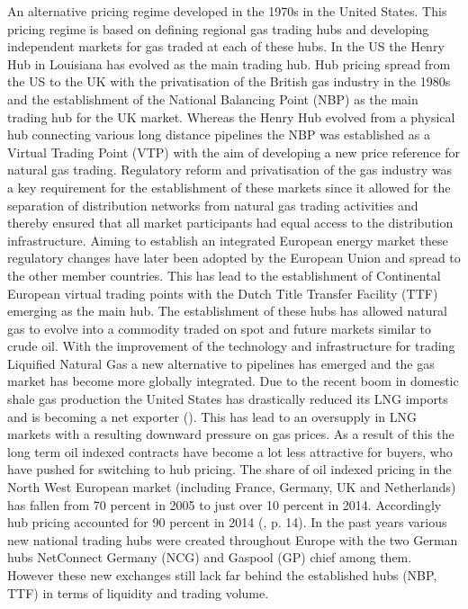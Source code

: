 An alternative pricing regime developed in the 1970s in the United States. This pricing regime is based on defining regional gas trading hubs and developing independent markets for gas traded at each of these hubs. In the US the Henry Hub in Louisiana has evolved as the main trading hub. Hub pricing spread from the US to the UK with the privatisation of the British gas industry in the 1980s and the establishment of the National Balancing Point (NBP) as the main trading hub for the UK market. Whereas the Henry Hub evolved from a physical hub connecting various long distance pipelines the NBP was established as a Virtual Trading Point (VTP) with the aim of developing a new price reference for natural gas trading. Regulatory reform and privatisation of the gas industry was a key requirement for the establishment of these markets since it  allowed for the separation of distribution networks from natural gas trading activities and thereby ensured that all market participants had equal access to the distribution infrastructure. Aiming to establish an integrated European energy market these regulatory changes have later been adopted by the European Union and spread to the other member countries. This has lead to the establishment of Continental European virtual trading points with the Dutch Title Transfer Facility (TTF) emerging as the main hub. The establishment of these hubs has allowed natural gas to evolve into a commodity traded on spot and future markets similar to crude oil. With the improvement of the technology and infrastructure for trading Liquified Natural Gas a new alternative to pipelines has emerged and the gas market has become more globally integrated. Due to the recent boom in domestic shale gas production the United States has drastically reduced its LNG imports and is becoming a net exporter (\cite{iea_world_2017}). This has lead to an oversupply in LNG markets with a resulting downward pressure on gas prices. As a result of this the long term oil indexed contracts have become a lot less attractive for buyers, who have pushed for switching to hub pricing. The share of oil indexed pricing in the North West European market (including France, Germany, UK and Netherlands) has fallen from 70 percent in 2005 to just over 10 percent in 2014. Accordingly hub pricing accounted for 90 percent in 2014 (\cite{heather_evolution_2015}, p. 14). 
In the past years various new national trading hubs were created throughout Europe with the two German hubs NetConnect Germany (NCG) and Gaspool (GP) chief among them. However these new exchanges still lack far behind the established hubs (NBP, TTF) in terms of liquidity and trading volume.

